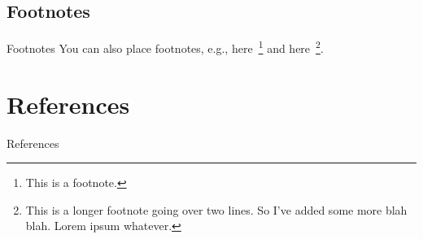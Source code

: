 \documentclass{beamer}
\begin{document}
\subsection{Footnotes}
\begin{frame}{Footnotes}
  You can also place footnotes, e.g.,
  here~\footnote{This is a footnote.}
  and here~\footnote{This is a longer footnote going over two lines.
    So I've added some more blah blah. Lorem ipsum whatever.}.
\end{frame}



\section{References}
\begin{frame}{References}

  \tiny\printbibliography
  
\end{frame}
\end{document}
